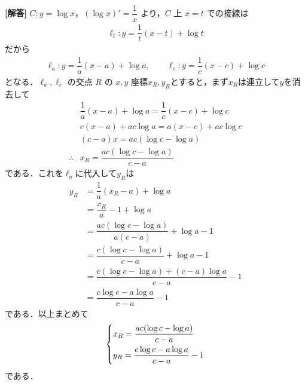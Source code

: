 \documentclass[../../main.tex]{subfiles}
\begin{document}
\begin{oframed}
  
\end{oframed}

{\bf [解答]}
$C: y=\log x$，$(\log x)'=\dfrac{1}{x}$ より，$C$ 上 $x=t$ での接線は
\begin{align}
  \ell_t: y=\dfrac{1}{t}(x-t)+\log t
\end{align}
だから
\begin{align}
  \ell_a: y=\dfrac{1}{a}(x-a)+\log a, \qquad \ell_c: y=\dfrac{1}{c}(x-c)+\log c
\end{align}
となる．$\ell_a,\ell_c$ の交点 $R$ の $x,y$ 座標$x_R, y_R$とすると，まず$x_R$は連立して$y$を消去して
\begin{align}
  & \dfrac{1}{a}(x-a)+\log a = \dfrac{1}{c}(x-c)+ \log c \\
  & c(x-a) + ac \log a = a(x-c) + ac \log c \\
  & (c-a)x = ac(\log c - \log a) \\
  \therefore
  & x_R = \dfrac{ac(\log c - \log a)}{c-a}
\end{align}
である．これを$\ell_a$に代入して$y_R$は
\begin{align}
  y_R
  & = \dfrac{1}{a}(x_R-a) + \log a \\
  & = \dfrac{x_R}{a} - 1 + \log a \\
  & = \dfrac{ac(\log c - \log a)}{a(c-a)} + \log a - 1\\
  & = \dfrac{c(\log c - \log a)}{c-a} + \log a - 1\\
  & = \dfrac{c(\log c - \log a)+ (c-a)\log a}{c-a} - 1 \\
  & = \dfrac{c\log c - a\log a }{c-a} -1
\end{align}
である．以上まとめて
\begin{align}
  \begin{dcases}
    x_R=\dfrac{ac(\log c-\log a)}{c-a} \\
    y_R=\dfrac{c\log c-a\log a}{c-a}-1
  \end{dcases}\label{eq:1}
\end{align}
である．
\end{document}
